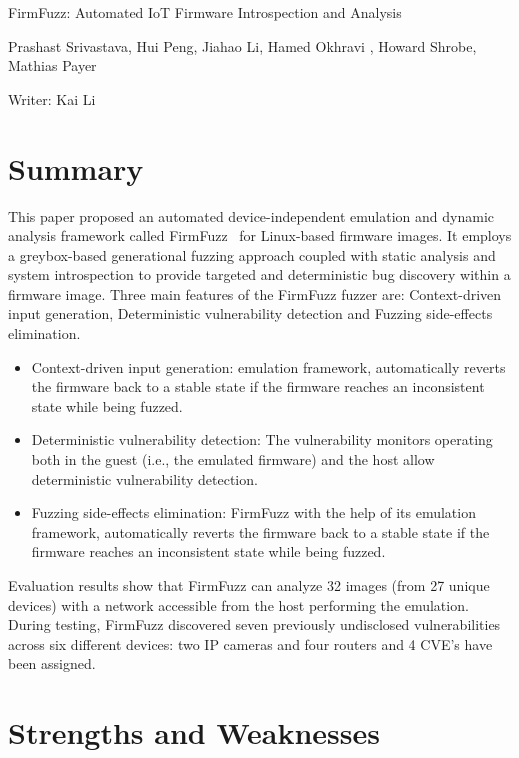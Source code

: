 \documentclass[letterpaper,11pt]{article}
\begin{document}
\begin{center}
{\Large FirmFuzz: Automated IoT Firmware Introspection and Analysis} 

{Prashast Srivastava, Hui Peng, Jiahao Li, Hamed Okhravi , Howard Shrobe, Mathias Payer}
\bigskip

{\large Writer: Kai Li}
\date{\today}
\end{center}


\section{Summary}
This paper proposed an automated device-independent emulation and dynamic analysis framework called FirmFuzz~\cite{FirmFuzz} for Linux-based firmware images. It employs a greybox-based generational fuzzing approach coupled with static analysis and system introspection to provide targeted and deterministic bug discovery within a firmware image. 
Three main features of the FirmFuzz fuzzer are: Context-driven input generation, Deterministic vulnerability detection and Fuzzing side-effects elimination.
\begin{itemize}
\item Context-driven input generation: emulation framework, automatically reverts the firmware back to a stable state if the firmware reaches an inconsistent state while being fuzzed.
\item Deterministic vulnerability detection: The vulnerability monitors operating both in the guest (i.e., the emulated firmware) and the host allow deterministic vulnerability detection.
\item Fuzzing side-effects elimination: FirmFuzz with the help of its emulation framework, automatically reverts the firmware back to a stable state if the firmware reaches an inconsistent state while being fuzzed.
\end{itemize}

Evaluation results show that FirmFuzz can analyze 32 images (from 27 unique devices) with a network accessible from the host performing the emulation. During testing, FirmFuzz discovered seven previously undisclosed vulnerabilities across six different devices: two IP cameras and four routers and 4 CVE’s have been assigned.

\section{Strengths and Weaknesses}
\end{document}

